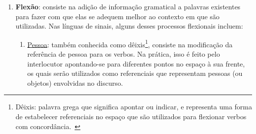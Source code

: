 \begin{enumerate}
\begin{enumerate}


          \end{enumerate}


    \item \textbf{Flexão}: consiste na adição de informação gramatical a palavras existentes para fazer com que elas se adequem melhor ao contexto em que são utilizadas. Nas línguas de sinais, alguns desses processos flexionais incluem:






          \begin{enumerate}
              \item \underline{Pessoa}: também conhecida como dêixis\footnote{
                        Dêixis: palavra grega que significa apontar ou indicar, e representa uma forma de estabelecer referenciais no espaço que são utilizados para flexionar verbos com concordância.~\cite{quadros-2004-estudos-linguisticos}
                    }, consiste na modificação da referência de pessoa para os verbos.
                    Na prática, isso é feito pelo interlocutor apontando-se para diferentes pontos no espaço à sua frente, os quais serão utilizados como referenciais que representam pessoas (ou objetos) envolvidas no discurso.


\end{enumerate}
\end{enumerate}
